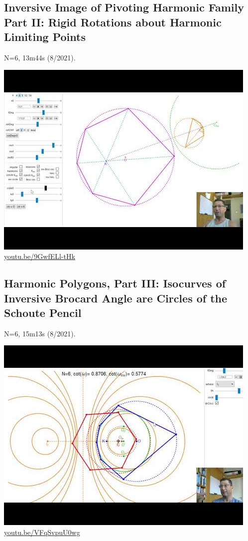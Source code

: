 \documentclass[12pt]{amsart}
\begin{document}
\subsection{Inversive Image of Pivoting Harmonic Family Part II: Rigid Rotations about Harmonic Limiting Points}
\label{vid:9GwfELl-tHk}
\noindent N=6, 13m44s (8/2021). 
\begin{center}\includegraphics[width=.5\textwidth]{pics/9GwfELl-tHk.jpg} \\ 
\href{https://youtu.be/9GwfELl-tHk}{\url{youtu.be/9GwfELl-tHk}}\end{center}
% 
\subsection{Harmonic Polygons, Part III: Isocurves of Inversive Brocard Angle are Circles of the Schoute Pencil}
\label{vid:VFqSvpuU0wg}
\noindent N=6, 15m13s (8/2021). 
\begin{center}\includegraphics[width=.5\textwidth]{pics/VFqSvpuU0wg.jpg} \\ 
\href{https://youtu.be/VFqSvpuU0wg}{\url{youtu.be/VFqSvpuU0wg}}\end{center}
% 
\end{document}
